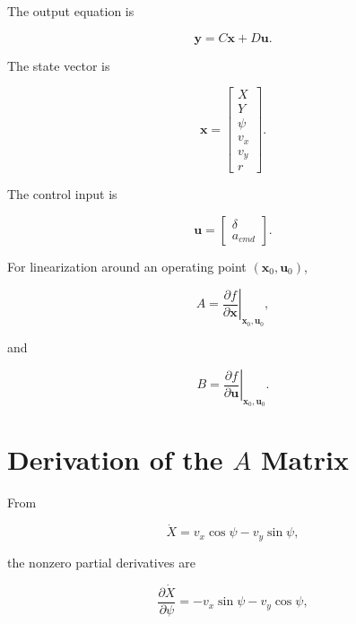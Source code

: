 \documentclass[12pt,a4paper]{article}
\begin{document}
The output equation is

\begin{equation}
\boxed{
\bm{y}
=
C\bm{x}
+
D\bm{u}
}.
\end{equation}

The state vector is

\begin{equation}
\boxed{
\bm{x}
=
\begin{bmatrix}
X\\
Y\\
\psi\\
v_x\\
v_y\\
r
\end{bmatrix}
}.
\end{equation}

The control input is

\begin{equation}
\boxed{
\bm{u}
=
\begin{bmatrix}
\delta\\
a_{cmd}
\end{bmatrix}
}.
\end{equation}

For linearization around an operating point $(\bm{x}_0,\bm{u}_0)$,

\begin{equation}
\boxed{
A
=
\left.
\frac{\partial f}{\partial\bm{x}}
\right|_{\bm{x}_0,\bm{u}_0}
},
\end{equation}

and

\begin{equation}
\boxed{
B
=
\left.
\frac{\partial f}{\partial\bm{u}}
\right|_{\bm{x}_0,\bm{u}_0}
}.
\end{equation}

\section{Derivation of the $A$ Matrix}

From

\begin{equation}
\dot X
=
v_x\cos\psi
-
v_y\sin\psi,
\end{equation}

the nonzero partial derivatives are

\begin{equation}
\frac{\partial\dot X}{\partial\psi}
=
-v_x\sin\psi
-v_y\cos\psi,
\end{equation}
\end{document}
